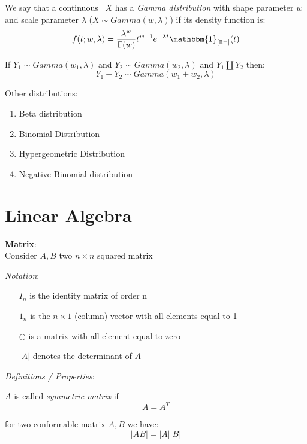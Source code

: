 \begin{defi}
	We say that a continuous \rv \  $X$ has a \textit{Gamma distribution} with shape parameter $w$ and scale parameter $\lambda$ ($X\sim Gamma(w,\lambda)$) if its density function is:
	$$f(t;w,\lambda)=\frac{\lambda^w}{\Gamma(w)}t^{w-1}e^{-\lambda t} \mathbbm{1}_{[\mathbb{R}^+]}(t)$$
\end{defi}

\begin{prop}
If $Y_1\sim Gamma(w_1,\lambda)$ and $Y_2\sim Gamma(w_2,\lambda)$ and $Y_1 \coprod Y_2$ then:
$$Y_1 + Y_2\sim Gamma(w_1+w_2,\lambda)$$
\end{prop}



Other distributions:
\begin{enumerate}
	\item Beta distribution
	\item Binomial Distribution
	\item Hypergeometric Distribution
	\item Negative Binomial distribution
\end{enumerate}


\section{Linear Algebra}
\textbf{Matrix}:\\
Consider $A,B$ two $n \times n$ squared matrix

\textit{Notation}:
\begin{enumerate}
	\item[$I_n$] is the identity matrix of order n
	\item[$1_n$] is the $n \times 1$ (column) vector with all elements equal to 1
	\item[$\bigcirc$] is a matrix with all element equal to zero
	\item[$|A|$] denotes the determinant of $A$
\end{enumerate}



\textit{Definitions / Properties}:

\begin{defi}
	$A$ is called \textit{symmetric matrix} if 
	$$A=A^T$$
\end{defi}


\begin{prop}
	for two conformable matrix $A,B$ we have:
	$$|AB|=|A||B|$$
\end{prop}


